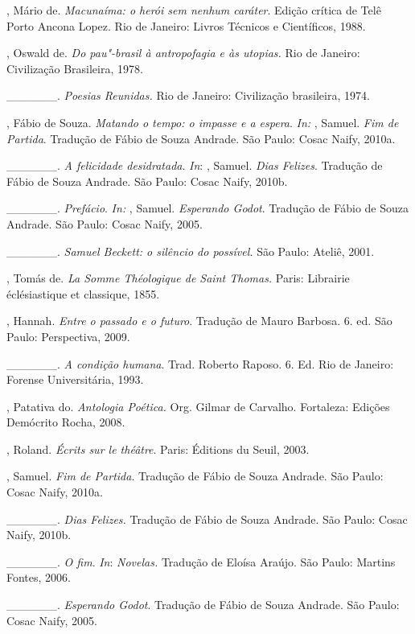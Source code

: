 \begin{Parskip}
, Mário de. \emph{Macunaíma: o herói sem nenhum caráter}. Edição crítica de
Telê Porto Ancona Lopez. Rio de Janeiro: Livros Técnicos e Científicos, 1988.

, Oswald de. \emph{Do pau"-brasil à antropofagia e às utopias.} Rio
de Janeiro: Civilização Brasileira, 1978.

\_\_\_\_\_\_. \emph{Poesias Reunidas.} Rio de Janeiro: Civilização brasileira, 1974.

, Fábio de Souza. \emph{Matando o tempo: o impasse e a espera}.
\emph{In:} , Samuel. \emph{Fim de Partida}. Tradução de Fábio de
Souza Andrade. São Paulo: Cosac Naify, 2010a.

\_\_\_\_\_\_. \emph{A felicidade desidratada}. \emph{In}: , Samuel.
\emph{Dias Felizes}. Tradução de Fábio de Souza Andrade. São Paulo: Cosac Naify, 2010b.

\_\_\_\_\_\_. \emph{Prefácio}. \emph{In:} , Samuel.
\emph{Esperando Godot}. Tradução de Fábio de Souza Andrade. São Paulo: Cosac Naify, 2005.

\_\_\_\_\_\_. \emph{Samuel Beckett: o silêncio do possível.} São Paulo: Ateliê, 2001.

, Tomás de. \emph{La Somme Théologique de Saint Thomas.} Paris:
Librairie éclésiastique et classique, 1855.

, Hannah. \emph{Entre o passado e o futuro}. Tradução de Mauro
Barbosa. 6. ed. São Paulo: Perspectiva, 2009.

\_\_\_\_\_\_. \emph{A condição humana}. Trad. Roberto Raposo. 6. Ed.
Rio de Janeiro: Forense Universitária, 1993.

, Patativa do. \emph{Antologia Poética.} Org. Gilmar de
Carvalho. Fortaleza: Edições Demócrito Rocha, 2008.

, Roland. \emph{Écrits sur le théâtre}. Paris: Éditions du
Seuil, 2003.

, Samuel. \emph{Fim de Partida}. Tradução de Fábio de Souza Andrade.
São Paulo: Cosac Naify, 2010a.

\_\_\_\_\_\_. \emph{Dias Felizes.} Tradução de Fábio de Souza Andrade. São Paulo: Cosac Naify, 2010b.

\_\_\_\_\_\_. \emph{O fim}. \emph{In}: \emph{Novelas.} Tradução de Eloísa
Araújo. São Paulo: Martins Fontes, 2006.

\_\_\_\_\_\_. \emph{Esperando Godot}. Tradução de Fábio de Souza Andrade. São
Paulo: Cosac Naify, 2005.


\end{Parskip}
